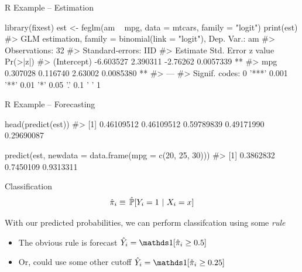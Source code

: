 \documentclass[aspectratio=169,t,11pt,table]{beamer}
\begin{document}
\begin{frame}[fragile]{R Example -- Estimation}
  \begin{codeblock}
library(fixest)
est <- feglm(am ~ mpg, data = mtcars, family = "logit")
print(est)
#> GLM estimation, family = binomial(link = "logit"), Dep. Var.: am
#> Observations: 32
#> Standard-errors: IID 
#>              Estimate Std. Error  z value  Pr(>|z|)    
#> (Intercept) -6.603527   2.390311 -2.76262 0.0057339 ** 
#> mpg          0.307028   0.116740  2.63002 0.0085380 ** 
#> ---
#> Signif. codes:  0 '***' 0.001 '**' 0.01 '*' 0.05 '.' 0.1 ' ' 1
  \end{codeblock}
\end{frame}


\begin{frame}[fragile]{R Example -- Forecasting}
  \begin{codeblock}
head(predict(est))
#> [1] 0.46109512 0.46109512 0.59789839 0.49171990 0.29690087 

predict(est, newdata = data.frame(mpg = c(20, 25, 30)))
#> [1] 0.3862832 0.7450109 0.9313311
  \end{codeblock}
\end{frame}

\begin{frame}{Classification}
  \vspace*{-\bigskipamount}
  $$
    \hat{\pi}_i \equiv \probhat{Y_i = 1}{X_i = x}
  $$

  \bigskip
  With our predicted probabilities, we can perform \alert{classifcation} using some \emph{rule}
  \begin{itemize}
    \item The obvious rule is forecast $\hat{Y}_i = \one{\hat{\pi}_i \geq 0.5}$ 
    
    \item Or, could use some other cutoff $\hat{Y}_i = \one{\hat{\pi}_i \geq 0.25}$ 
  \end{itemize}
\end{frame}
\end{document}

